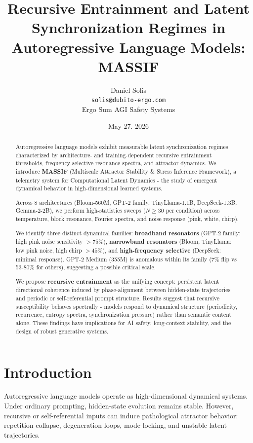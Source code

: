 \documentclass{article}
\title{Recursive Entrainment and Latent Synchronization Regimes in Autoregressive Language Models: MASSIF}
\author{Daniel Solis \\
\texttt{solis@dubito-ergo.com} \\
Ergo Sum AGI Safety Systems}
\date{May 27. 2026}
\begin{document}
\maketitle

\begin{abstract}
Autoregressive language models exhibit measurable latent synchronization regimes characterized by architecture- and training-dependent recursive entrainment thresholds, frequency-selective resonance spectra, and attractor dynamics. We introduce \textbf{MASSIF} (Multiscale Attractor Stability \& Stress Inference Framework), a telemetry system for Computational Latent Dynamics - the study of emergent dynamical behavior in high-dimensional learned systems.

Across 8 architectures (Bloom-560M, GPT-2 family, TinyLlama-1.1B, DeepSeek-1.3B, Gemma-2-2B), we perform high-statistics sweeps ($N \geq 30$ per condition) across temperature, block resonance, Fourier spectra, and noise response (pink, white, chirp).

We identify three distinct dynamical families: \textbf{broadband resonators} (GPT-2 family: high pink noise sensitivity $>75\%$), \textbf{narrowband resonators} (Bloom, TinyLlama: low pink noise, high chirp $>45\%$), and \textbf{high-frequency selective} (DeepSeek: minimal response). GPT-2 Medium (355M) is anomalous within its family (7\% flip vs 53-80\% for others), suggesting a possible critical scale.

We propose \textbf{recursive entrainment} as the unifying concept: persistent latent directional coherence induced by phase-alignment between hidden-state trajectories and periodic or self-referential prompt structure. Results suggest that recursive susceptibility behaves spectrally - models respond to dynamical structure (periodicity, recurrence, entropy spectra, synchronization pressure) rather than semantic content alone. These findings have implications for AI safety, long-context stability, and the design of robust generative systems.
\end{abstract}

\section{Introduction}

Autoregressive language models operate as high-dimensional dynamical systems. Under ordinary prompting, hidden-state evolution remains stable. However, recursive or self-referential inputs can induce pathological attractor behavior: repetition collapse, degeneration loops, mode-locking, and unstable latent trajectories.
\end{document}
